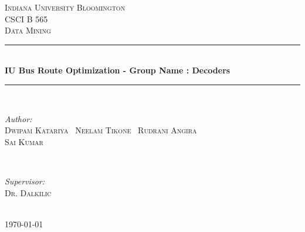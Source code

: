 \documentclass[12pt]{article}
\begin{document}
\begin{titlepage}

\newcommand{\HRule}{\rule{\linewidth}{0.5mm}}

\center 
 

\textsc{\LARGE Indiana University Bloomington}\\[1.5cm] 
\textsc{\Large CSCI B 565}\\[0.5cm] 
\textsc{\large Data Mining}\\[0.5cm] 


\HRule \\[0.4cm]
{ \huge \bfseries IU Bus Route Optimization - Group Name : Decoders}\\[0.4cm] 
\HRule \\[1.5cm]
 

\begin{minipage}{0.4\textwidth}
\begin{flushleft} \large
\emph{Author:}\\
\textsc{Dwipam Katariya \ Neelam Tikone \ Rudrani Angira \\ Sai Kumar  } 
\end{flushleft}
\end{minipage}
~
\begin{minipage}{0.4\textwidth}
\begin{flushright} \large
\emph{Supervisor:} \\
\textsc{Dr. Dalkilic} 
\end{flushright}
\end{minipage}\\[2cm]



{\large \today}\\[2cm] 


\vfill 

\end{titlepage}
\end{document}
